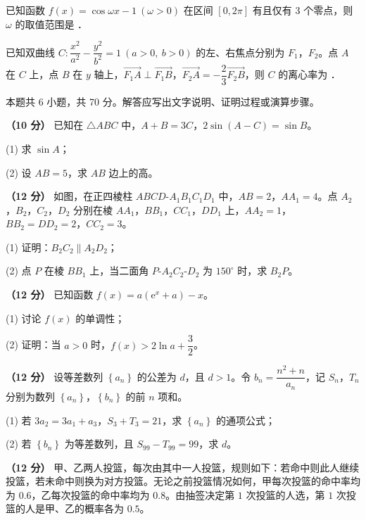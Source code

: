 已知函数 $f(x)=\cos\omega x-1\ (\omega>0)$ 在区间 $[0,2\pi]$ 有且仅有 $3$ 个零点，则 $\omega$ 的取值范围是 \gkblank{}．

已知双曲线 $C:\dfrac{x^{2}}{a^{2}}-\dfrac{y^{2}}{b^{2}}=1\ (a>0,\ b>0)$ 的左、右焦点分别为 $F_1$，$F_2$。点 $A$ 在 $C$ 上，点 $B$ 在 $y$ 轴上，$\overrightarrow{F_1A}\perp\overrightarrow{F_1B}$，$\overrightarrow{F_2A}=-\dfrac23\overrightarrow{F_2B}$，则 $C$ 的离心率为 \gkblank{}．

\par\medskip


\begin{gktip}
本题共 6 小题，共 70 分。解答应写出文字说明、证明过程或演算步骤。
\end{gktip}

\textbf{（10 分）} 已知在 $\triangle ABC$ 中，$A+B=3C$，$2\sin(A-C)=\sin B$。

  (1) 求 $\sin A$；

  (2) 设 $AB=5$，求 $AB$ 边上的高。

\textbf{（12 分）} 如图，在正四棱柱 $ABCD\text{-}A_1B_1C_1D_1$ 中，$AB=2$，$AA_1=4$。点 $A_2$，$B_2$，$C_2$，$D_2$ 分别在棱 $AA_1$，$BB_1$，$CC_1$，$DD_1$ 上，$AA_2=1$，$BB_2=DD_2=2$，$CC_2=3$。

\begin{center}\end{center}

  (1) 证明：$B_2C_2\parallel A_2D_2$；

  (2) 点 $P$ 在棱 $BB_1$ 上，当二面角 $P\text{-}A_2C_2\text{-}D_2$ 为 $150^\circ$ 时，求 $B_2P$。

\textbf{（12 分）} 已知函数 $f(x)=a\left(\mathrm e^{x}+a\right)-x$。

  (1) 讨论 $f(x)$ 的单调性；

  (2) 证明：当 $a>0$ 时，$f(x)>2\ln a+\dfrac32$。

\textbf{（12 分）} 设等差数列 $\left\{a_n\right\}$ 的公差为 $d$，且 $d>1$。令 $b_n=\dfrac{n^{2}+n}{a_n}$，记 $S_n$，$T_n$ 分别为数列 $\left\{a_n\right\}$，$\left\{b_n\right\}$ 的前 $n$ 项和。

  (1) 若 $3a_2=3a_1+a_3$，$S_3+T_3=21$，求 $\left\{a_n\right\}$ 的通项公式；

  (2) 若 $\left\{b_n\right\}$ 为等差数列，且 $S_{99}-T_{99}=99$，求 $d$。

\textbf{（12 分）} 甲、乙两人投篮，每次由其中一人投篮，规则如下：若命中则此人继续投篮，若未命中则换为对方投篮。无论之前投篮情况如何，甲每次投篮的命中率均为 $0.6$，乙每次投篮的命中率均为 $0.8$。由抽签决定第 $1$ 次投篮的人选，第 $1$ 次投篮的人是甲、乙的概率各为 $0.5$。


